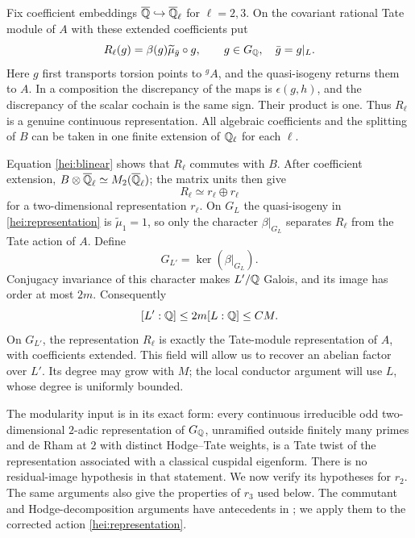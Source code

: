 Fix coefficient embeddings $\overline{\mathbb Q}\hookrightarrow
\overline{\mathbb Q}_\ell$ for $\ell=2,3$.  On the covariant rational Tate
module of $A$ with these extended coefficients put
\begin{equation}\label{hei:representation}
 R_\ell(g)=\beta(g)\widetilde\mu_{\bar g}\circ g,
       \qquad g\in G_\mathbb Q,\quad \bar g=g|_L.
\end{equation}
Here $g$ first transports torsion points to \({}^gA\), and the
quasi-isogeny returns them to $A$.  In a composition the discrepancy
of the maps is $\epsilon(g,h)$, and the discrepancy of the scalar
cochain is the same sign.  Their product is one.  Thus $R_\ell$ is
a genuine continuous representation.  All algebraic coefficients
and the splitting of $B$ can be taken in one finite extension of
$\mathbb Q_\ell$ for each $\ell$.

Equation \eqref{hei:blinear} shows that $R_\ell$ commutes with $B$.
After coefficient extension, $B\otimes\overline{\mathbb Q}_\ell\simeq
M_2(\overline{\mathbb Q}_\ell)$; the matrix units then give
\begin{equation}\label{hei:double-copy}
                         R_\ell\simeq r_\ell\oplus r_\ell
\end{equation}
for a two-dimensional representation $r_\ell$.  On $G_L$ the
quasi-isogeny in \eqref{hei:representation} is
$\widetilde\mu_1=1$, so only the character $\beta|_{G_L}$ separates
$R_\ell$ from the Tate action of $A$.  Define
\[
                   G_{L'}=\ker(\beta|_{G_L}).
\]
Conjugacy invariance of this character makes $L'/\mathbb Q$ Galois, and its
image has order at most $2m$.  Consequently
\begin{equation}\label{hei:lprime-degree}
                     [L':\mathbb Q]\le 2m[L:\mathbb Q]\le C M.
\end{equation}
On $G_{L'}$, the representation $R_\ell$ is exactly the Tate-module
representation of $A$, with coefficients extended.  This field will
allow us to recover an abelian factor over $L'$.  Its degree may grow
with $M$; the local conductor argument will use $L$, whose degree is
uniformly bounded.

\begin{samepage}
The modularity input is \cite[Theorem 1.1]{OddRegularFontaineMazurAtTwo}
in its exact form: every continuous irreducible odd two-dimensional
$2$-adic representation of $G_\mathbb Q$, unramified outside finitely many
primes and de Rham at $2$ with distinct Hodge--Tate weights, is a Tate
twist of the representation associated with a classical cuspidal
eigenform.  There is no residual-image hypothesis in that statement.
We now verify its hypotheses for $r_2$.  The same arguments also give
the properties of $r_3$ used below.  The commutant and
Hodge-decomposition arguments have antecedents in
\cite[Section~3]{Ribet1992}; we apply them to the corrected action
\eqref{hei:representation}.
\end{samepage}

